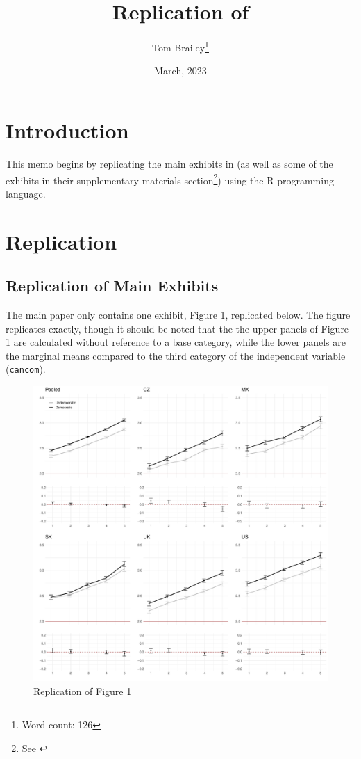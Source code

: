 \documentclass[
  12pt,
]{article}
\title{Replication of \textcite{Frederiksen2022a}}
\author{Tom Brailey\footnote{Word count: 126}}
\date{March, 2023}
\begin{document}
\maketitle

{
\hypersetup{linkcolor=}
\setcounter{tocdepth}{2}
\tableofcontents
}
\hypertarget{introduction}{%
\section{Introduction}\label{introduction}}

This memo begins by replicating the main exhibits in \textcite{Frederiksen2022a} (as well as some of the exhibits in their supplementary materials section\footnote{See \autocite{Frederiksen2022b,Frederiksen2022c}}) using the R programming language.

\hypertarget{replication}{%
\section{Replication}\label{replication}}

\hypertarget{replication-of-main-exhibits}{%
\subsection{Replication of Main Exhibits}\label{replication-of-main-exhibits}}

The main paper only contains one exhibit, Figure 1, replicated below. The figure replicates exactly, though it should be noted that the the upper panels of Figure 1 are calculated without reference to a base category, while the lower panels are the marginal means compared to the third category of the independent variable (\texttt{cancom}).

\begin{figure}
\centering
\includegraphics{../exhibits/figures/figure1_replication.pdf}
\caption{\label{fig:unnamed-chunk-1}Replication of Figure 1}
\end{figure}
\end{document}

